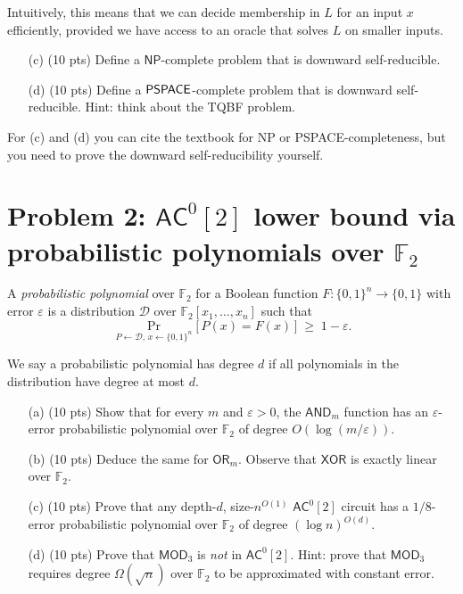 \documentclass[12pt]{article}
\begin{document}
Intuitively, this means that we can decide membership in $L$ for an input $x$ efficiently, provided we have access to an oracle that solves $L$ on smaller inputs.

\begin{enumerate}
    \item[(c)] (10 pts) Define a $\mathsf{NP}$-complete problem that is downward self-reducible.

    \item[(d)] (10 pts) Define a $\textsf{PSPACE}$-complete problem that is downward self-reducible. Hint: think about the TQBF problem.
\end{enumerate}

For (c) and (d) you can cite the textbook for NP or PSPACE-completeness, but you need to prove the downward self-reducibility yourself.

\newpage

\section{Problem 2: $\mathsf{AC}^0[2]$ lower bound via probabilistic polynomials over $\mathbb{F}_2$}

A \emph{probabilistic polynomial} over $\mathbb{F}_2$ for a Boolean function $F:\{0,1\}^n\to\{0,1\}$ with error $\varepsilon$ is a distribution $\mathcal{D}$ over $\mathbb{F}_2[x_1,\dots,x_n]$ such that
\[
    \Pr_{P\leftarrow \mathcal{D},\,x\leftarrow\{0,1\}^n}\big[\,P(x)=F(x)\,\big]\;\ge\;1-\varepsilon.
\]

We say a probabilistic polynomial has degree $d$ if all polynomials in the distribution have degree at most $d$.

\begin{enumerate}
    \item[(a)] (10 pts) Show that for every $m$ and $\varepsilon>0$, the $\mathsf{AND}_m$ function has an $\varepsilon$-error probabilistic polynomial over $\mathbb{F}_2$ of degree $O(\log(m/\varepsilon))$. 
    \item[(b)] (10 pts) Deduce the same for $\mathsf{OR}_m$. Observe that $\mathsf{XOR}$ is exactly linear over $\mathbb{F}_2$.
    \item[(c)] (10 pts) Prove that any depth-$d$, size-$n^{O(1)}$ $\mathsf{AC}^0[2]$ circuit has a $1/8$-error probabilistic polynomial over $\mathbb{F}_2$ of degree $(\log n)^{O(d)}$.
    \item[(d)] (10 pts) Prove that $\mathsf{MOD}_3$ is \emph{not} in $\mathsf{AC}^0[2]$. Hint: prove that $\mathsf{MOD}_3$ requires degree $\Omega(\sqrt{n})$ over $\mathbb{F}_2$ to be approximated with constant error.
\end{enumerate}
\end{document}
